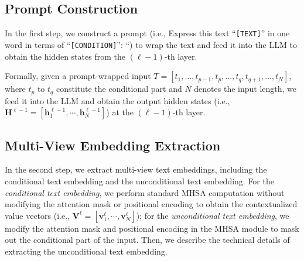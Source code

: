\documentclass[11pt]{article}
\newcommand{\vv}{\mathbf{v}}
\begin{document}
\subsection{Prompt Construction}
In the first step, we construct a prompt (i.e., Express this text ``\texttt{[TEXT]}'' in one word in terms of ``\texttt{[CONDITION]}'': ``) to wrap the text and feed it into the LLM to obtain the hidden states from the $(\ell-1)$-th layer.

Formally, given a prompt-wrapped input $T = [t_1, \ldots, t_{p-1}, t_p, \ldots, t_q, t_{q+1}, \dots, t_N]$, where $t_p$ to $t_q$ constitute the conditional part and $N$ denotes the input length, we feed it into the LLM and obtain the output hidden states (i.e., $\mathbf{H}^{\ell-1} = [\mathbf{h}^{\ell-1}_1, \cdots, \mathbf{h}^{\ell-1}_N]$) at the $(\ell-1)$-th layer.

\subsection{Multi-View Embedding Extraction}
In the second step, we extract multi-view text embeddings, including the conditional text embedding and the unconditional text embedding.
For the \textit{conditional text embedding}, we perform standard MHSA computation without modifying the attention mask or positional encoding to obtain the contextualized value vectors (i.e., $\mathbf{V}^{\ell} = [\vv^{\ell}_1, \cdots, \vv^{\ell}_{N}]$);
for the \textit{unconditional text embedding}, we modify the attention mask and positional encoding in the MHSA module to mask out the conditional part of the input.
Then, we describe the technical details of extracting the unconditional text embedding.
\end{document}
